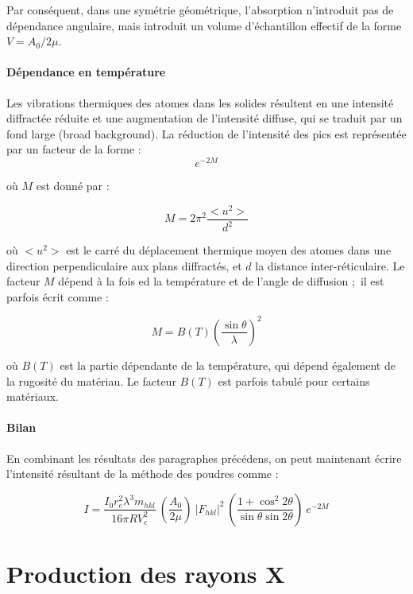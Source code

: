Par conséquent, dans une symétrie géométrique, l'absorption n'introduit pas de dépendance angulaire, mais introduit un volume d'échantillon effectif de la forme $V = A_0 / 2\mu$.

\paragraph{Dépendance en température}

Les vibrations thermiques des atomes dans les solides résultent en une intensité diffractée réduite et une augmentation de l'intensité diffuse, qui se traduit par un fond large (broad background). La réduction de l'intensité des pics est représentée par un facteur de la forme :
\begin{equation}
    e^{-2M}
\end{equation}

où $M$ est donné par :

\begin{equation}
    M = 2 \pi^2 \frac{<u^2>}{d^2}
\end{equation}

où $<u^2>$ est le carré du déplacement thermique moyen des atomes dans une direction perpendiculaire aux plans diffractés, et $d$ la distance inter-réticulaire. Le facteur $M$ dépend à la fois ed la température et de l'angle de diffusion ; il est parfois écrit comme :

\begin{equation}
    M = B(T) \left( \frac{\sin \theta}{\lambda} \right)^2
\end{equation}

où $B(T)$ est la partie dépendante de la température, qui dépend également de la rugosité du matériau. Le facteur $B(T)$ est parfois tabulé pour certains matériaux.

\paragraph{Bilan}

En combinant les résultats des paragraphes précédens, on peut maintenant écrire l'intensité résultant de la méthode des poudres comme :

\begin{equation}
    I = 
        \frac{I_0 r_e^2 \lambda^3 m_{hkl}}{16\pi R V_c^2}\ 
        \left(\frac{A_0}{2\mu} \right) \
        |F_{hkl}|^2 \ 
        \left( \frac{1+\cos^2 2\theta}{\sin\theta \sin 2\theta} \right)\ 
        e^{-2M}
\end{equation}

\section{Production des rayons X}

